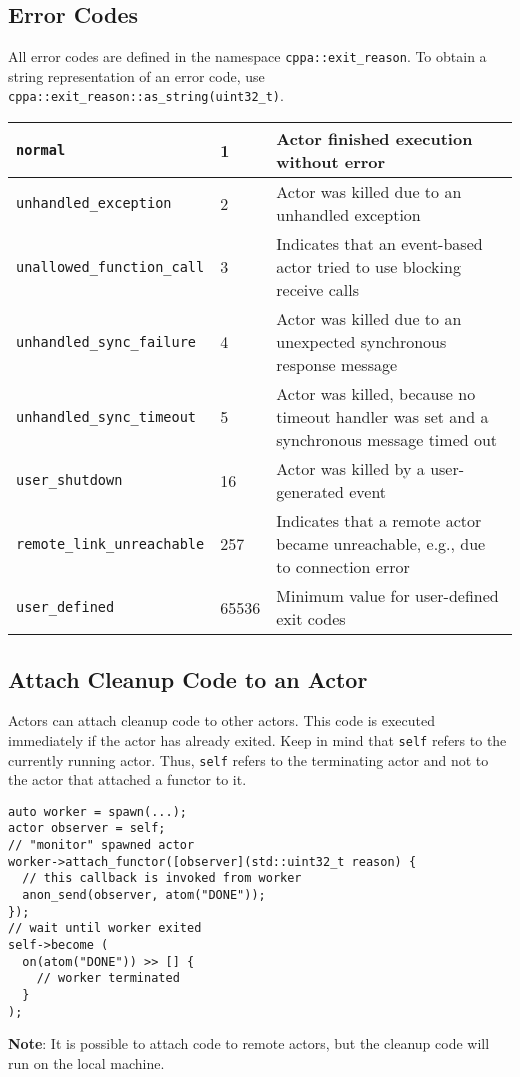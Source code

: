 \subsection{Error Codes}

All error codes are defined in the namespace \lstinline^cppa::exit_reason^.
To obtain a string representation of an error code, use \lstinline^cppa::exit_reason::as_string(uint32_t)^.

\begin{tabular*}{\textwidth}{m{}m{}m{}}
  \hline
  \lstinline^normal^ & 1 & Actor finished execution without error \\
  \hline
  \lstinline^unhandled_exception^ & 2 & Actor was killed due to an unhandled exception \\
  \hline
  \lstinline^unallowed_function_call^ & 3 & Indicates that an event-based actor tried to use blocking receive calls \\
  \hline
  \lstinline^unhandled_sync_failure^ & 4 & Actor was killed due to an unexpected synchronous response message \\
  \hline
  \lstinline^unhandled_sync_timeout^ & 5 & Actor was killed, because no timeout handler was set and a synchronous message timed out \\
  \hline
  \lstinline^user_shutdown^ & 16 & Actor was killed by a user-generated event \\
  \hline
  \lstinline^remote_link_unreachable^ & 257 & Indicates that a remote actor became unreachable, e.g., due to connection error \\
  \hline
  \lstinline^user_defined^ & 65536 & Minimum value for user-defined exit codes \\
  \hline
\end{tabular*}

\subsection{Attach Cleanup Code to an Actor}

Actors can attach cleanup code to other actors.
This code is executed immediately if the actor has already exited.
Keep in mind that \lstinline^self^ refers to the currently running actor.
Thus, \lstinline^self^ refers to the terminating actor and not to the actor that attached a functor to it.

\begin{lstlisting}
auto worker = spawn(...);
actor observer = self;
// "monitor" spawned actor
worker->attach_functor([observer](std::uint32_t reason) {
  // this callback is invoked from worker
  anon_send(observer, atom("DONE"));
});
// wait until worker exited
self->become (
  on(atom("DONE")) >> [] {
    // worker terminated
  }
);
\end{lstlisting}

\textbf{Note}: It is possible to attach code to remote actors, but the cleanup code will run on the local machine.
